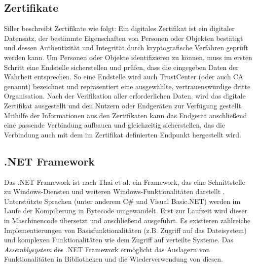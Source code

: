         \subsection{Zertifikate}
        Siller beschreibt Zertifikate wie folgt:
        \glqq Ein digitales Zertifikat ist ein digitaler Datensatz, der bestimmte Eigenschaften von Personen oder Objekten bestätigt und dessen Authentizität und Integrität durch kryptografische Verfahren geprüft werden kann.\grqq{} \cite{siller_2018}
        Um Personen oder Objekte identifizieren zu können, muss im ersten Schritt eine Endstelle sicherstellen und prüfen, dass die eingegeben Daten der Wahrheit entsprechen. So eine Endstelle wird auch TrustCenter (oder auch \glqq \ac{CA}\grqq{} genannt) bezeichnet und repräsentiert eine ausgewählte, vertrauenswürdige dritte Organisation. Nach der Verifikation aller erforderlichen Daten, wird das digitale Zertifikat ausgestellt und den Nutzern oder Endgeräten zur Verfügung gestellt. Mithilfe der Informationen aus den Zertifikaten kann das Endgerät anschließend eine passende Verbindung aufbauen und gleichzeitig sicherstellen, das die Verbindung auch mit dem im Zertifikat definierten Endpunkt hergestellt wird.
    
    \subsection{.NET Framework}
        Das .NET Framework ist nach Thai et al. ein Framework, das eine Schnittstelle zu Windows-Diensten und weiteren Windows-Funktionalitäten darstellt \cite{thai2003net}.
        Unterstützte Sprachen (unter anderem C\# und Visual Basic.NET) werden im Laufe der Kompilierung in Bytecode umgewandelt. Erst zur Laufzeit wird dieser in Maschinencode übersetzt und anschließend ausgeführt. Es existieren zahlreiche Implementierungen von Basisfunktionalitäten (z.B. Zugriff auf das Dateisystem) und komplexen Funktionalitäten wie dem Zugriff auf verteilte Systeme. 
        Das \emph{Assemblysystem} des .NET Framework ermöglicht das Auslagern von Funktionalitäten in Bibliotheken und die Wiederverwendung von diesen.
        
